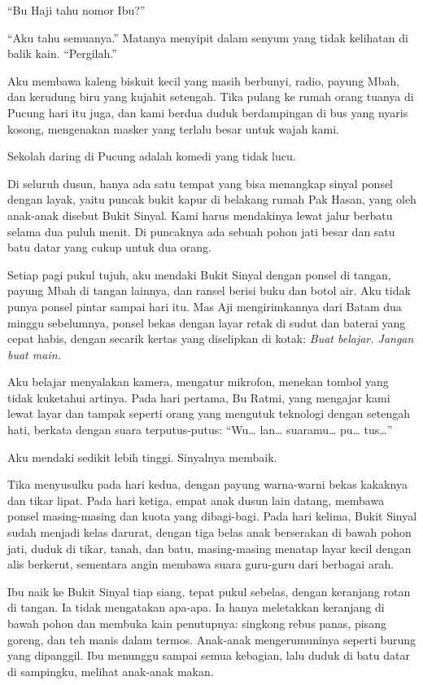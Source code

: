 \documentclass[11pt,twoside,openany]{book}
\makeatletter
\newcommand{\scenebreak}{\par\vspace{0.9em}{\centering\textsc{*\hspace{0.7em}*\hspace{0.7em}*}\par}\vspace{0.9em}\@afterindentfalse\@afterheading}
\makeatother
\begin{document}
``Bu Haji tahu nomor Ibu?''

``Aku tahu semuanya.'' Matanya menyipit dalam senyum yang tidak kelihatan di balik kain. ``Pergilah.''

Aku membawa kaleng biskuit kecil yang masih berbunyi, radio, payung Mbah, dan kerudung biru yang kujahit setengah. Tika pulang ke rumah orang tuanya di Pucung hari itu juga, dan kami berdua duduk berdampingan di bus yang nyaris kosong, mengenakan masker yang terlalu besar untuk wajah kami.

\scenebreak
Sekolah daring di Pucung adalah komedi yang tidak lucu.

Di seluruh dusun, hanya ada satu tempat yang bisa menangkap sinyal ponsel dengan layak, yaitu puncak bukit kapur di belakang rumah Pak Hasan, yang oleh anak-anak disebut Bukit Sinyal. Kami harus mendakinya lewat jalur berbatu selama dua puluh menit. Di puncaknya ada sebuah pohon jati besar dan satu batu datar yang cukup untuk dua orang.

Setiap pagi pukul tujuh, aku mendaki Bukit Sinyal dengan ponsel di tangan, payung Mbah di tangan lainnya, dan ransel berisi buku dan botol air. Aku tidak punya ponsel pintar sampai hari itu. Mas Aji mengirimkannya dari Batam dua minggu sebelumnya, ponsel bekas dengan layar retak di sudut dan baterai yang cepat habis, dengan secarik kertas yang diselipkan di kotak: \emph{Buat belajar. Jangan buat main.}

Aku belajar menyalakan kamera, mengatur mikrofon, menekan tombol yang tidak kuketahui artinya. Pada hari pertama, Bu Ratmi, yang mengajar kami lewat layar dan tampak seperti orang yang mengutuk teknologi dengan setengah hati, berkata dengan suara terputus-putus: ``Wu\ldots{} lan\ldots{} suaramu\ldots{} pu\ldots{} tus\ldots{}''

Aku mendaki sedikit lebih tinggi. Sinyalnya membaik.

Tika menyusulku pada hari kedua, dengan payung warna-warni bekas kakaknya dan tikar lipat. Pada hari ketiga, empat anak dusun lain datang, membawa ponsel masing-masing dan kuota yang dibagi-bagi. Pada hari kelima, Bukit Sinyal sudah menjadi kelas darurat, dengan tiga belas anak berserakan di bawah pohon jati, duduk di tikar, tanah, dan batu, masing-masing menatap layar kecil dengan alis berkerut, sementara angin membawa suara guru-guru dari berbagai arah.

Ibu naik ke Bukit Sinyal tiap siang, tepat pukul sebelas, dengan keranjang rotan di tangan. Ia tidak mengatakan apa-apa. Ia hanya meletakkan keranjang di bawah pohon dan membuka kain penutupnya: singkong rebus panas, pisang goreng, dan teh manis dalam termos. Anak-anak mengerumuninya seperti burung yang dipanggil. Ibu menunggu sampai semua kebagian, lalu duduk di batu datar di sampingku, melihat anak-anak makan.
\end{document}
